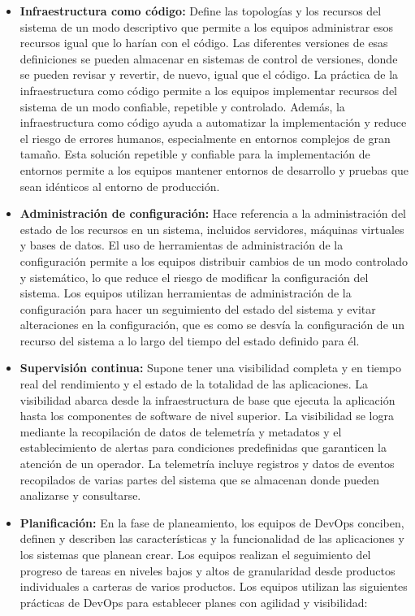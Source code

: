 \begin{itemize}
    \item \textbf{Infraestructura como código: }Define las topologías y los recursos del sistema de un modo descriptivo que permite a los equipos administrar esos recursos igual que lo harían con el código. Las diferentes versiones de esas definiciones se pueden almacenar en sistemas de control de versiones, donde se pueden revisar y revertir, de nuevo, igual que el código. La práctica de la infraestructura como código permite a los equipos implementar recursos del sistema de un modo confiable, repetible y controlado. Además, la infraestructura como código ayuda a automatizar la implementación y reduce el riesgo de errores humanos, especialmente en entornos complejos de gran tamaño. Esta solución repetible y confiable para la implementación de entornos permite a los equipos mantener entornos de desarrollo y pruebas que sean idénticos al entorno de producción.
    \item \textbf{Administración de configuración: }Hace referencia a la administración del estado de los recursos en un sistema, incluidos servidores, máquinas virtuales y bases de datos. El uso de herramientas de administración de la configuración permite a los equipos distribuir cambios de un modo controlado y sistemático, lo que reduce el riesgo de modificar la configuración del sistema. Los equipos utilizan herramientas de administración de la configuración para hacer un seguimiento del estado del sistema y evitar alteraciones en la configuración, que es como se desvía la configuración de un recurso del sistema a lo largo del tiempo del estado definido para él.
    \item \textbf{Supervisión continua: }Supone tener una visibilidad completa y en tiempo real del rendimiento y el estado de la totalidad de las aplicaciones. La visibilidad abarca desde la infraestructura de base que ejecuta la aplicación hasta los componentes de software de nivel superior. La visibilidad se logra mediante la recopilación de datos de telemetría y metadatos y el establecimiento de alertas para condiciones predefinidas que garanticen la atención de un operador. La telemetría incluye registros y datos de eventos recopilados de varias partes del sistema que se almacenan donde pueden analizarse y consultarse.
    \item \textbf{Planificación: }En la fase de planeamiento, los equipos de DevOps conciben, definen y describen las características y la funcionalidad de las aplicaciones y los sistemas que planean crear. Los equipos realizan el seguimiento del progreso de tareas en niveles bajos y altos de granularidad desde productos individuales a carteras de varios productos. Los equipos utilizan las siguientes prácticas de DevOps para establecer planes con agilidad y visibilidad:

\end{itemize}
